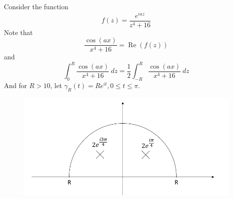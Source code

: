 \documentclass{article}
\DeclareMathOperator{\real}{Re}
\begin{document}
\begin{enumerate}
Consider the function
\[
f(z) = \frac{e^{iaz}}{z^4 + 16}
\]
Note that
\[\frac{\cos (ax)}{x^4 + 16} = \real(f(z))\]
and
\[\int_0^R \frac{\cos (ax)}{x^4 + 16}\ dz = \frac{1}{2}\int_{-R}^R \frac{\cos (ax)}{x^4 + 16}\ dz\]
And for $R > 10$, let $\gamma_R(t) = R e^{it}, 0\leq t \leq \pi$.
\begin{figure}[h]
\centering
\includegraphics[scale=0.6]{Q4_diagram}
\end{figure}


\end{enumerate}
\end{document}
